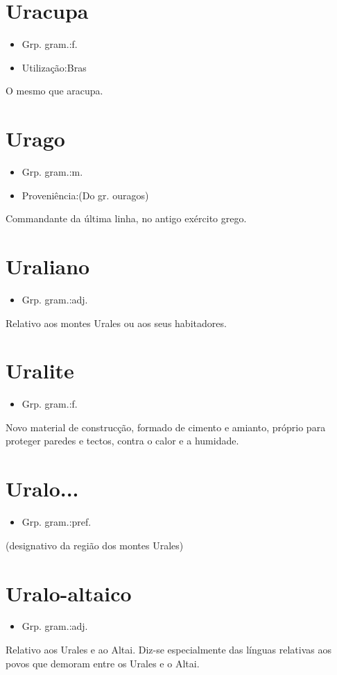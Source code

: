 \documentclass{article}
\begin{document}
\section{Uracupa}
\begin{itemize}
\item {Grp. gram.:f.}
\end{itemize}
\begin{itemize}
\item {Utilização:Bras}
\end{itemize}
O mesmo que \textunderscore aracupa\textunderscore .
\section{Urago}
\begin{itemize}
\item {Grp. gram.:m.}
\end{itemize}
\begin{itemize}
\item {Proveniência:(Do gr. \textunderscore ouragos\textunderscore )}
\end{itemize}
Commandante da última linha, no antigo exército grego.
\section{Uraliano}
\begin{itemize}
\item {Grp. gram.:adj.}
\end{itemize}
Relativo aos montes Urales ou aos seus habitadores.
\section{Uralite}
\begin{itemize}
\item {Grp. gram.:f.}
\end{itemize}
Novo material de construcção, formado de cimento e amianto, próprio para proteger paredes e tectos, contra o calor e a humidade.
\section{Uralo...}
\begin{itemize}
\item {Grp. gram.:pref.}
\end{itemize}
(designativo da região dos montes Urales)
\section{Uralo-altaico}
\begin{itemize}
\item {Grp. gram.:adj.}
\end{itemize}
Relativo aos Urales e ao Altai.
Diz-se especialmente das línguas relativas aos povos que demoram entre os Urales e o Altai.
\end{document}
